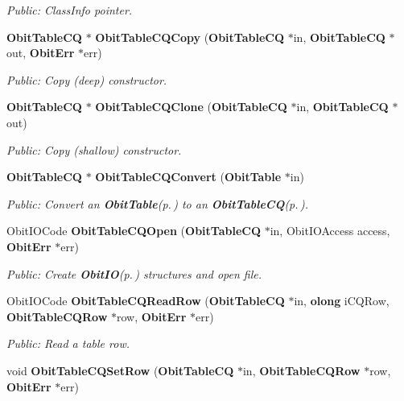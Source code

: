 \begin{CompactItemize}
\begin{CompactList}\small\item\em Public: Class\-Info pointer. \item\end{CompactList}\item 
{\bf Obit\-Table\-CQ} $\ast$ {\bf Obit\-Table\-CQCopy} ({\bf Obit\-Table\-CQ} $\ast$in, {\bf Obit\-Table\-CQ} $\ast$out, {\bf Obit\-Err} $\ast$err)
\begin{CompactList}\small\item\em Public: Copy (deep) constructor. \item\end{CompactList}\item 
{\bf Obit\-Table\-CQ} $\ast$ {\bf Obit\-Table\-CQClone} ({\bf Obit\-Table\-CQ} $\ast$in, {\bf Obit\-Table\-CQ} $\ast$out)
\begin{CompactList}\small\item\em Public: Copy (shallow) constructor. \item\end{CompactList}\item 
{\bf Obit\-Table\-CQ} $\ast$ {\bf Obit\-Table\-CQConvert} ({\bf Obit\-Table} $\ast$in)
\begin{CompactList}\small\item\em Public: Convert an {\bf Obit\-Table}{\rm (p.\,\pageref{structObitTable})} to an {\bf Obit\-Table\-CQ}{\rm (p.\,\pageref{structObitTableCQ})}. \item\end{CompactList}\item 
Obit\-IOCode {\bf Obit\-Table\-CQOpen} ({\bf Obit\-Table\-CQ} $\ast$in, Obit\-IOAccess access, {\bf Obit\-Err} $\ast$err)
\begin{CompactList}\small\item\em Public: Create {\bf Obit\-IO}{\rm (p.\,\pageref{structObitIO})} structures and open file. \item\end{CompactList}\item 
Obit\-IOCode {\bf Obit\-Table\-CQRead\-Row} ({\bf Obit\-Table\-CQ} $\ast$in, {\bf olong} i\-CQRow, {\bf Obit\-Table\-CQRow} $\ast$row, {\bf Obit\-Err} $\ast$err)
\begin{CompactList}\small\item\em Public: Read a table row. \item\end{CompactList}\item 
void {\bf Obit\-Table\-CQSet\-Row} ({\bf Obit\-Table\-CQ} $\ast$in, {\bf Obit\-Table\-CQRow} $\ast$row, {\bf Obit\-Err} $\ast$err)

\end{CompactItemize}

